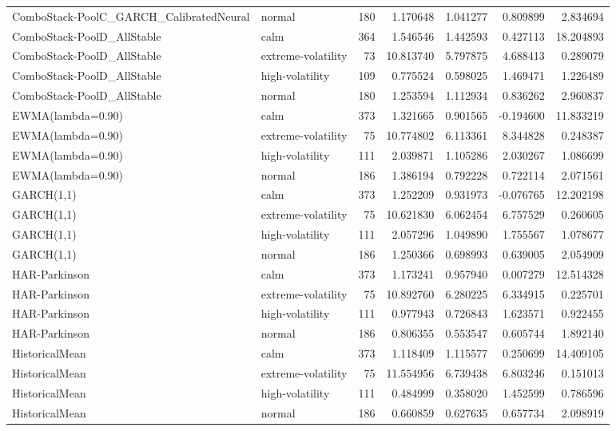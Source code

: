 \begin{tabular}{l l r r r r r}
ComboStack-PoolC\_GARCH\_CalibratedNeural & normal & 180 & 1.170648 & 1.041277 & 0.809899 & 2.834694 \\
ComboStack-PoolD\_AllStable & calm & 364 & 1.546546 & 1.442593 & 0.427113 & 18.204893 \\
ComboStack-PoolD\_AllStable & extreme-volatility & 73 & 10.813740 & 5.797875 & 4.688413 & 0.289079 \\
ComboStack-PoolD\_AllStable & high-volatility & 109 & 0.775524 & 0.598025 & 1.469471 & 1.226489 \\
ComboStack-PoolD\_AllStable & normal & 180 & 1.253594 & 1.112934 & 0.836262 & 2.960837 \\
EWMA(lambda=0.90) & calm & 373 & 1.321665 & 0.901565 & -0.194600 & 11.833219 \\
EWMA(lambda=0.90) & extreme-volatility & 75 & 10.774802 & 6.113361 & 8.344828 & 0.248387 \\
EWMA(lambda=0.90) & high-volatility & 111 & 2.039871 & 1.105286 & 2.030267 & 1.086699 \\
EWMA(lambda=0.90) & normal & 186 & 1.386194 & 0.792228 & 0.722114 & 2.071561 \\
GARCH(1,1) & calm & 373 & 1.252209 & 0.931973 & -0.076765 & 12.202198 \\
GARCH(1,1) & extreme-volatility & 75 & 10.621830 & 6.062454 & 6.757529 & 0.260605 \\
GARCH(1,1) & high-volatility & 111 & 2.057296 & 1.049890 & 1.755567 & 1.078677 \\
GARCH(1,1) & normal & 186 & 1.250366 & 0.698993 & 0.639005 & 2.054909 \\
HAR-Parkinson & calm & 373 & 1.173241 & 0.957940 & 0.007279 & 12.514328 \\
HAR-Parkinson & extreme-volatility & 75 & 10.892760 & 6.280225 & 6.334915 & 0.225701 \\
HAR-Parkinson & high-volatility & 111 & 0.977943 & 0.726843 & 1.623571 & 0.922455 \\
HAR-Parkinson & normal & 186 & 0.806355 & 0.553547 & 0.605744 & 1.892140 \\
HistoricalMean & calm & 373 & 1.118409 & 1.115577 & 0.250699 & 14.409105 \\
HistoricalMean & extreme-volatility & 75 & 11.554956 & 6.739438 & 6.803246 & 0.151013 \\
HistoricalMean & high-volatility & 111 & 0.484999 & 0.358020 & 1.452599 & 0.786596 \\
HistoricalMean & normal & 186 & 0.660859 & 0.627635 & 0.657734 & 2.098919 \\

\end{tabular}
